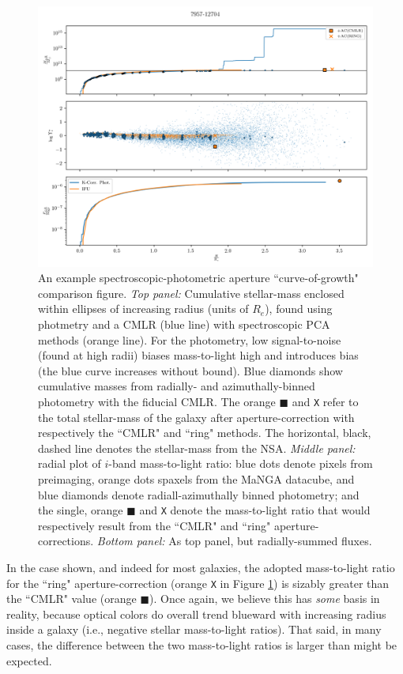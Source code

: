 \begin{figure}
    \centering
    \includegraphics[width=\textwidth]{7957-12704_photspec_compare}
    \caption[Spectroscopic-photometric aperture curve of growth]{\fixspacing An example spectroscopic-photometric aperture ``curve-of-growth" comparison figure. \textit{Top panel:} Cumulative stellar-mass enclosed within ellipses of increasing radius (units of $R_e$), found using photmetry and a CMLR (blue line) with spectroscopic PCA methods (orange line). For the photometry, low signal-to-noise (found at high radii) biases mass-to-light high and introduces bias (the blue curve increases without bound). Blue diamonds show cumulative masses from radially- and azimuthally-binned photometry with the fiducial CMLR. The orange $\blacksquare$ and \texttt{X} refer to the total stellar-mass of the galaxy after aperture-correction with respectively the ``CMLR" and ``ring" methods. The horizontal, black, dashed line denotes the stellar-mass from the NSA. \textit{Middle panel:} radial plot of $i$-band mass-to-light ratio: blue dots denote pixels from preimaging, orange dots spaxels from the MaNGA datacube, and blue diamonds denote radiall-azimuthally binned photometry; and the single, orange $\blacksquare$ and \texttt{X} denote the mass-to-light ratio that would respectively result from the ``CMLR" and ``ring" aperture-corrections. \textit{Bottom panel:} As top panel, but radially-summed fluxes.}
    \label{fig:specphot_compare}
\end{figure}

In the case shown, and indeed for most galaxies, the adopted mass-to-light ratio for the ``ring" aperture-correction (orange \texttt{X} in Figure \ref{fig:specphot_compare}) is sizably greater than the ``CMLR" value (orange $\blacksquare$). Once again, we believe this has \emph{some} basis in reality, because optical colors do overall trend blueward with increasing radius inside a galaxy (i.e., negative stellar mass-to-light ratios). That said, in many cases, the difference between the two mass-to-light ratios is larger than might be expected. 


